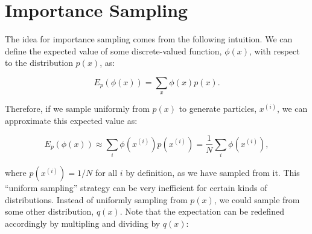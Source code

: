 \documentclass{article}
\begin{document}
%
%
%

\section{Importance Sampling} \label{sec:IS}

The idea for importance sampling comes from the following intuition.  We can define the expected value of some discrete-valued function, $\phi(x)$, with respect to the distribution $p(x)$, as:

\begin{equation}
E_p(\phi(x)) = \sum_x \phi(x) p(x).
\end{equation}

\noindent Therefore, if we sample uniformly from $p(x)$ to generate particles, $x^{(i)}$, we can approximate this expected value as:

\begin{equation}
E_p(\phi(x)) \approx \sum_i \phi(x^{(i)}) p(x^{(i)}) = \frac{1}{N} \sum_i \phi(x^{(i)}),
\end{equation}

\noindent where $p(x^{(i)}) = 1/N$ for all $i$ by definition, as we have sampled from it.  This ``uniform sampling'' strategy can be very inefficient for certain kinds of distributions. Instead of uniformly sampling from $p(x)$, we could sample from some other distribution, $q(x)$.  Note that the expectation can be redefined accordingly by multipling and dividing by $q(x)$:
\end{document}
